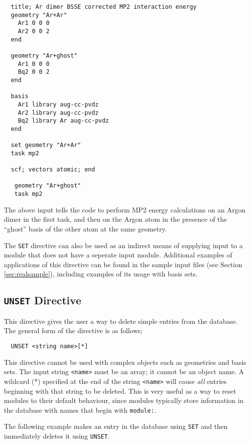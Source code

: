 \begin{verbatim}
  title; Ar dimer BSSE corrected MP2 interaction energy
  geometry "Ar+Ar"
    Ar1 0 0 0
    Ar2 0 0 2
  end

  geometry "Ar+ghost"
    Ar1 0 0 0
    Bq2 0 0 2
  end

  basis
    Ar1 library aug-cc-pvdz
    Ar2 library aug-cc-pvdz
    Bq2 library Ar aug-cc-pvdz
  end

  set geometry "Ar+Ar"
  task mp2 

  scf; vectors atomic; end

   geometry "Ar+ghost"
   task mp2 
\end{verbatim}

The above input tells the code to perform MP2 energy calculations 
on an Argon dimer in the first task, and then
on the Argon atom in the presence of the ``ghost'' basis of the other
atom at the same geometry.

The \verb+SET+ directive can also be used as an indirect means of
supplying input to a module that does not have a seperate input module.  
Additional examples of applications of this
directive can be found in the sample input files (see Section 
\ref{sec:realsample}), including examples of its usage with basis sets.

\subsection{{\tt UNSET} Directive}
\label{sec:unset}

This directive gives the user a way to delete simple entries from the
database.  The general form of the directive is as follows;

\begin{verbatim}
  UNSET <string name>[*]
\end{verbatim}

This directive cannot be used with complex objects such as geometries
and basis sets.  The input string \verb+<name>+ must be an array; it cannot
be an
object name.  A wildcard (*) specified at the end of the string
\verb+<name>+ will cause {\em all} entries beginning with that string to
be deleted.  This is very useful as a way to reset modules to their
default behaviour, since modules typically store information in the
database with names that begin with \verb+module:+.

The following example makes an entry in the database using \verb+SET+
and then immediately deletes it using \verb+UNSET+.

